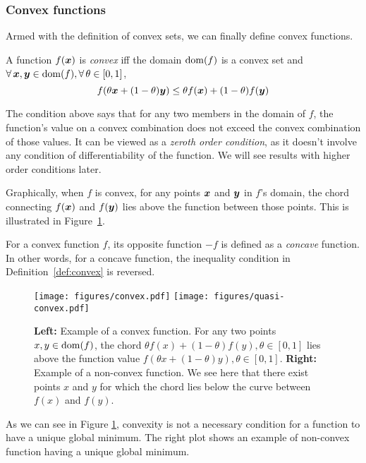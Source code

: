 \documentclass{article}
\begin{document}
\subsubsection{Convex functions}
\label{subsubsec:convexAnalysis:background:convexSets}
Armed with the definition of convex sets, we can finally define convex functions.
\begin{defn}
A function $f({\bm{x}})$ is \emph{convex} iff the domain $\operatorname{dom}(f)$ is a convex set and $\forall \vx, \vy \in \dom(f), \forall \theta \in [0,1]$,
\[
	f(\theta {\bm{x}}+ (1-\theta){\bm{y}}) \leq \theta f({\bm{x}}) + (1-\theta)f({\bm{y}})
\]
\label{def:convex}
\end{defn}

The condition above says that for any two members in the domain of $f$, the function's value on a convex combination does not exceed the convex combination of those values. 
It can be viewed as a \textit{zeroth order condition}, as it doesn't involve any condition of differentiability of the function. 
We will see results with higher order conditions later.

Graphically, when $f$ is convex, for any points ${\bm{x}}$ and ${\bm{y}}$ in $f$'s domain, the chord connecting $f({\bm{x}})$ and $f({\bm{y}})$ lies above the function between those points. 
This is illustrated in Figure~\ref{fig:convex}.

For a convex function $f$, its opposite function $-f$ is defined as a \emph{concave} function. 
In other words, for a concave function, the inequality condition in Definition~\ref{def:convex} is reversed.

\begin{figure}[ht]
\centering
    \texttt{[image: figures/convex.pdf]}
    \texttt{[image: figures/quasi-convex.pdf]}
    \caption[]{\textbf{Left:} Example of a convex function. 
    For any two points $x,y \in \operatorname{dom}(f)$, the chord $\theta f(x) + (1-\theta)f(y), \theta \in [0,1]$ lies above the function value $f(\theta x+ (1-\theta)y), \theta \in [0,1]$. 
    \textbf{Right:} Example of a non-convex function\footnotemark[2]. 
    We see here that there exist points $x$ and $y$ for which the chord lies below the curve between $f(x)$ and $f(y)$.}
    \label{fig:convex}
\end{figure}

As we can see in Figure \ref{fig:convex}, convexity is not a necessary condition for a function to have a unique global minimum. 
The right plot shows an example of non-convex function having a unique global minimum.
\end{document}
